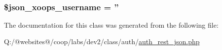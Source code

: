\hypertarget{class_xortify_auth_rest___json_ac058687d82a56fb93513e7e58c4ec391}{
\subsubsection[{\$json\-\_\-xoops\-\_\-username}]{\setlength{\rightskip}{0pt plus 5cm}\$json\-\_\-xoops\-\_\-username = ''}}\label{class_xortify_auth_rest___json_ac058687d82a56fb93513e7e58c4ec391}


The documentation for this class was generated from the following file\-:\begin{DoxyCompactItemize}
\item 
Q\-:/@websites@/coop/labs/dev2/class/auth/\hyperlink{auth__rest__json_8php}{auth\-\_\-rest\-\_\-json.\-php}\end{DoxyCompactItemize}
